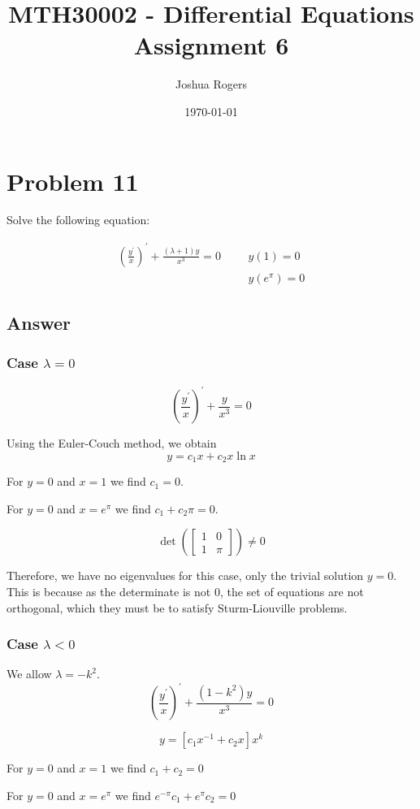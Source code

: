 \documentclass{article}
\title{\vspace{-4cm}MTH30002 - Differential Equations Assignment 6}
\author{Joshua Rogers}
\date\today
\begin{document}
\maketitle

\section*{Problem 11}

Solve the following equation:

\begin{align}\label{11}
\left(\frac{y^{'}}{x}\right)^{'} + \frac{\left(\lambda + 1\right)y}{x^3} = 0 && &y(1) =0 \\
&& &y(e^\pi)=0 \nonumber
\end{align}
\subsection*{Answer}

\subsubsection*{Case $\lambda=0$}
$$ \left(\frac{y^{'}}{x}\right)^{'} + \frac{y}{x^3} = 0 $$

Using the Euler-Couch method, we obtain
$$y = c_1 x + c_2 x \ln x$$

For $y=0$ and $x=1$ we find $c_1 = 0$.

For $y=0$ and $x=e^\pi$ we find $c_1+c_2\pi=0$.

$$\det \left( \begin{bmatrix} 1 & 0 \\ 1 & \pi \end{bmatrix} \right) \neq 0$$

Therefore, we have no eigenvalues for this case, only the trivial solution $y=0$. This is because as the determinate is not 0, the set of equations are not orthogonal, which they must be to satisfy Sturm-Liouville problems.

\subsubsection*{Case $\lambda < 0$}
We allow $\lambda = -k^2$.
$$\left(\frac{y^{'}}{x}\right)^{'} + \frac{\left(1-k^2 \right)y}{x^3} = 0$$

$$y = \left[c_1x^{-1}+c_2x\right]x^k$$

For $y=0$ and $x=1$ we find $c_1+c_2=0$

For $y=0$ and $x=e^\pi$ we find $e^{-\pi}c_1 + e^{\pi}c_2 = 0$
\end{document}
